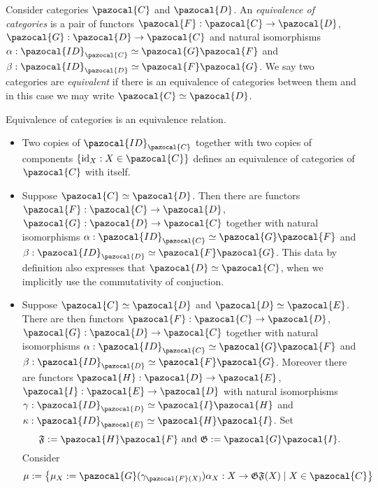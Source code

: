     \begin{definition}
        Consider categories $\pazocal{C}$ and $\pazocal{D}$. An \emph{equivalence of categories} is a pair of functors $\pazocal{F}: \pazocal{C}\rightarrow \pazocal{D}$, $\pazocal{G}:\pazocal{D}\rightarrow \pazocal{C}$ and natural isomorphisms $\alpha : \pazocal{ID}_\pazocal{C} \simeq \pazocal{G}\pazocal{F}$ and $\beta: \pazocal{ID}_\pazocal{D} \simeq \pazocal{F}\pazocal{G}$. We say two categories are \emph{equivalent} if there is an equivalence of categories between them and in this case we may write $\pazocal{C}\simeq \pazocal{D}$. 
    \end{definition}
    \begin{remark}
        Equivalence of categories is an equivalence relation. 
        \begin{itemize}
            \item Two copies of $\pazocal{ID}_\pazocal{C}$ together with two copies of components $\{\id_X : X\in \pazocal{C}\}$ defines an equivalence of categories of $\pazocal{C}$ with itself.
            \item Suppose $\pazocal{C}\simeq \pazocal{D}$. Then there are functors $\pazocal{F}: \pazocal{C}\rightarrow \pazocal{D}$, $\pazocal{G}: \pazocal{D}\rightarrow \pazocal{C}$ together with natural isomorphisms $\alpha: \pazocal{ID}_\pazocal{C}\simeq \pazocal{G}\pazocal{F}$ and $\beta:\pazocal{ID}_\pazocal{D}\simeq \pazocal{F}\pazocal{G}$. This data by definition also expresses that $\pazocal{D}\simeq \pazocal{C}$, when we implicitly use the commutativity of conjuction. 
            \item Suppose $\pazocal{C}\simeq \pazocal{D}$ and $\pazocal{D}\simeq \pazocal{E}$. There are then functors  $\pazocal{F}: \pazocal{C}\rightarrow \pazocal{D}$, $\pazocal{G}: \pazocal{D}\rightarrow \pazocal{C}$ together with natural isomorphisms $\alpha: \pazocal{ID}_\pazocal{C}\simeq \pazocal{G}\pazocal{F}$ and $\beta:\pazocal{ID}_\pazocal{D}\simeq \pazocal{F}\pazocal{G}$. Moreover there are functors $\pazocal{H} : \pazocal{D}\rightarrow\pazocal{E}$, $\pazocal{I}: \pazocal{E}\rightarrow \pazocal{D}$ with natural isomorphisms $\gamma : \pazocal{ID}_{\pazocal{D}} \simeq \pazocal{I}\pazocal{H}$ and $\kappa : \pazocal{ID}_\pazocal{E} \simeq \pazocal{H}\pazocal{I}$. Set 
            $$
                \mathfrak{F} := \pazocal{H}\pazocal{F} \text{ and } \mathfrak{G} := \pazocal{G}\pazocal{I}.
            $$
            Consider
            $$
                \mu := \left\{\mu_X:=\pazocal{G}(\gamma_{\pazocal{F}(X)})\alpha_X : X\rightarrow \mathfrak{GF}(X) \mid X\in \pazocal{C}\right\}
$$
\end{itemize}
\end{remark}
